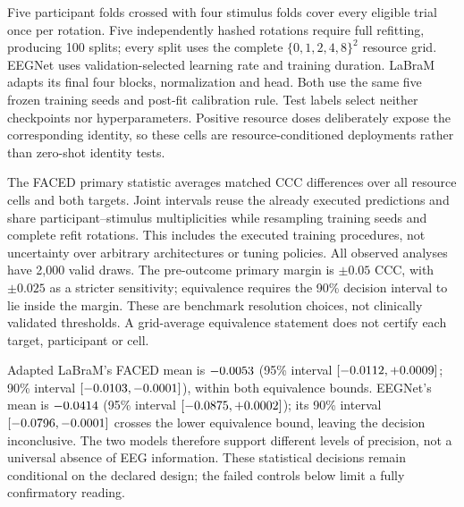 Five participant folds crossed with four stimulus folds cover every eligible
trial once per rotation. Five independently hashed rotations require full
refitting, producing 100 splits; every split uses the complete
$\{0,1,2,4,8\}^2$ resource grid. EEGNet uses validation-selected learning rate
and training duration. LaBraM adapts its final four blocks, normalization and
head. Both use the same five frozen training seeds and post-fit calibration
rule. Test labels select neither checkpoints nor hyperparameters. Positive
resource doses deliberately expose the corresponding identity, so these cells
are resource-conditioned deployments rather than zero-shot identity tests.

The FACED primary statistic averages matched CCC differences over all resource
cells and both targets. Joint intervals reuse the already executed predictions
and share participant--stimulus multiplicities while resampling training seeds
and complete refit rotations. This includes the executed training procedures,
not uncertainty over arbitrary architectures or tuning policies. All observed
analyses have 2,000 valid draws. The pre-outcome primary margin is
$\pm0.05$ CCC, with $\pm0.025$ as a stricter sensitivity; equivalence requires
the 90\% decision interval to lie inside the margin. These are benchmark
resolution choices, not clinically validated thresholds. A grid-average
equivalence statement does not certify each target, participant or cell.



Adapted LaBraM's FACED mean is $-0.0053$ (95\% interval
$[-0.0112, +0.0009]$; 90\% interval $[-0.0103, -0.0001]$), within both
equivalence bounds. EEGNet's mean is $-0.0414$ (95\% interval
$[-0.0875, +0.0002]$); its 90\% interval $[-0.0796, -0.0001]$ crosses the
lower equivalence bound, leaving the decision inconclusive. The two models
therefore support different levels of precision, not a universal absence of
EEG information. These statistical decisions remain conditional on the
declared design; the failed controls below limit a fully confirmatory reading.

